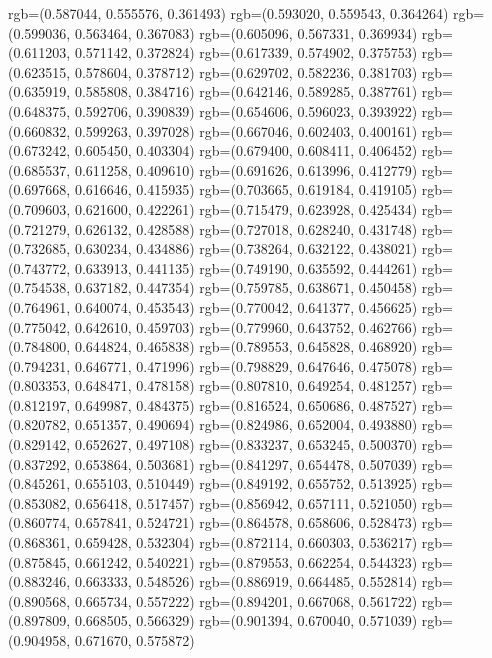 {{{					rgb=(0.587044, 0.555576, 0.361493)
					rgb=(0.593020, 0.559543, 0.364264)
					rgb=(0.599036, 0.563464, 0.367083)
					rgb=(0.605096, 0.567331, 0.369934)
					rgb=(0.611203, 0.571142, 0.372824)
					rgb=(0.617339, 0.574902, 0.375753)
					rgb=(0.623515, 0.578604, 0.378712)
					rgb=(0.629702, 0.582236, 0.381703)
					rgb=(0.635919, 0.585808, 0.384716)
					rgb=(0.642146, 0.589285, 0.387761)
					rgb=(0.648375, 0.592706, 0.390839)
					rgb=(0.654606, 0.596023, 0.393922)
					rgb=(0.660832, 0.599263, 0.397028)
					rgb=(0.667046, 0.602403, 0.400161)
					rgb=(0.673242, 0.605450, 0.403304)
					rgb=(0.679400, 0.608411, 0.406452)
					rgb=(0.685537, 0.611258, 0.409610)
					rgb=(0.691626, 0.613996, 0.412779)
					rgb=(0.697668, 0.616646, 0.415935)
					rgb=(0.703665, 0.619184, 0.419105)
					rgb=(0.709603, 0.621600, 0.422261)
					rgb=(0.715479, 0.623928, 0.425434)
					rgb=(0.721279, 0.626132, 0.428588)
					rgb=(0.727018, 0.628240, 0.431748)
					rgb=(0.732685, 0.630234, 0.434886)
					rgb=(0.738264, 0.632122, 0.438021)
					rgb=(0.743772, 0.633913, 0.441135)
					rgb=(0.749190, 0.635592, 0.444261)
					rgb=(0.754538, 0.637182, 0.447354)
					rgb=(0.759785, 0.638671, 0.450458)
					rgb=(0.764961, 0.640074, 0.453543)
					rgb=(0.770042, 0.641377, 0.456625)
					rgb=(0.775042, 0.642610, 0.459703)
					rgb=(0.779960, 0.643752, 0.462766)
					rgb=(0.784800, 0.644824, 0.465838)
					rgb=(0.789553, 0.645828, 0.468920)
					rgb=(0.794231, 0.646771, 0.471996)
					rgb=(0.798829, 0.647646, 0.475078)
					rgb=(0.803353, 0.648471, 0.478158)
					rgb=(0.807810, 0.649254, 0.481257)
					rgb=(0.812197, 0.649987, 0.484375)
					rgb=(0.816524, 0.650686, 0.487527)
					rgb=(0.820782, 0.651357, 0.490694)
					rgb=(0.824986, 0.652004, 0.493880)
					rgb=(0.829142, 0.652627, 0.497108)
					rgb=(0.833237, 0.653245, 0.500370)
					rgb=(0.837292, 0.653864, 0.503681)
					rgb=(0.841297, 0.654478, 0.507039)
					rgb=(0.845261, 0.655103, 0.510449)
					rgb=(0.849192, 0.655752, 0.513925)
					rgb=(0.853082, 0.656418, 0.517457)
					rgb=(0.856942, 0.657111, 0.521050)
					rgb=(0.860774, 0.657841, 0.524721)
					rgb=(0.864578, 0.658606, 0.528473)
					rgb=(0.868361, 0.659428, 0.532304)
					rgb=(0.872114, 0.660303, 0.536217)
					rgb=(0.875845, 0.661242, 0.540221)
					rgb=(0.879553, 0.662254, 0.544323)
					rgb=(0.883246, 0.663333, 0.548526)
					rgb=(0.886919, 0.664485, 0.552814)
					rgb=(0.890568, 0.665734, 0.557222)
					rgb=(0.894201, 0.667068, 0.561722)
					rgb=(0.897809, 0.668505, 0.566329)
					rgb=(0.901394, 0.670040, 0.571039)
					rgb=(0.904958, 0.671670, 0.575872)
}}}
